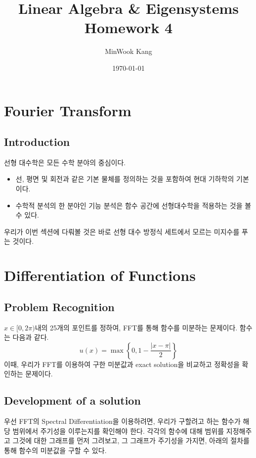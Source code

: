 \documentclass[11pt]{article}
\title{Linear Algebra \& Eigensystems Homework 4}
\author{MinWook Kang}
\date{\today}
\begin{document}
\maketitle
\pagebreak




\section{Fourier Transform}
\subsection{Introduction} 
선형 대수학은 모든 수학 분야의 중심이다. 
\begin{itemize}
    \item 선, 평면 및 회전과 같은 기본 물체를 정의하는 것을 포함하여 현대 기하학의 기본이다.
    \item 수학적 분석의 한 분야인 기능 분석은 함수 공간에 선형대수학을 적용하는 것을 볼 수 있다.
\end{itemize}
우리가 이번 섹션에 다뤄볼 것은 바로 선형 대수 방정식 세트에서 모르는  미지수를 푸는 것이다.








\section{Differentiation of Functions} 
\subsection{Problem Recognition} 
$x \in [0, 2\pi)$내의 25개의 포인트를 정하여, FFT를 통해 함수를 미분하는 문제이다. 함수는 다음과 같다.
\begin{equation}
\displaystyle u(x) = \max\left\{0, 1 - \frac{|x - \pi|}{2}\right\}
\end{equation}
이때, 우리가 FFT를 이용하여 구한 미분값과 exact solution을 비교하고 정확성을 확인하는 문제이다. 
\subsection{Development of a solution} 
우선 FFT의 Spectral Differentiation을 이용하려면, 우리가 구할려고 하는 함수가 해당 범위에서 주기성을 이루는지를 확인해야 한다. 각각의 함수에 대해 범위를 지정해주고 그것에 대한 그래프를 먼저 그려보고, 그 그래프가 주기성을 가지면, 아래의 절차를 통해 함수의 미분값을 구할 수 있다.
\end{document}
